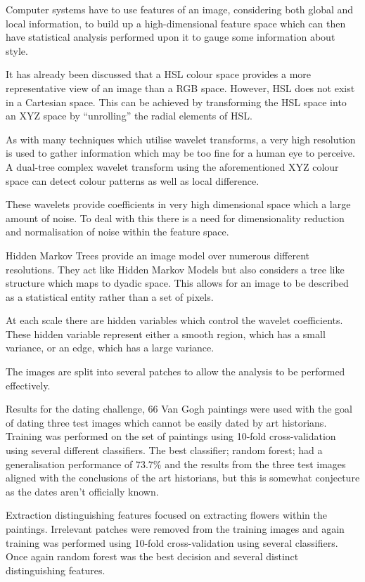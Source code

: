 \documentclass[conference]{IEEEtran}
\begin{document}
Computer systems have to use features of an image, considering both global and
local information, to build up a high-dimensional feature space which can then
have statistical analysis performed upon it to gauge some information about
style.

It has already been discussed that a \gls{HSL} colour space provides a more
representative view of an image than a \gls{RGB} space. However, \gls{HSL} does
not exist in a Cartesian space. This can be achieved by transforming the
\gls{HSL} space into an XYZ space by ``unrolling'' the radial elements of
\gls{HSL}.

As with many techniques which utilise wavelet transforms, a very high
resolution is used to gather information which may be too fine for a human eye
to perceive. A dual-tree complex wavelet transform using the aforementioned XYZ
colour space can detect colour patterns as well as local difference.

These wavelets provide coefficients in very high dimensional space which a
large amount of noise. To deal with this there is a need for dimensionality
reduction and normalisation of noise within the feature space.

Hidden Markov Trees provide an image model over numerous different resolutions.
They act like Hidden Markov Models but also considers a tree like structure
which maps to dyadic space. This allows for an image to be described as a
statistical entity rather than a set of pixels.

At each scale there are hidden variables which control the wavelet
coefficients. These hidden variable represent either a smooth region, which has
a small variance, or an edge, which has a large variance.

The images are split into several patches to allow the analysis to be performed
effectively.

Results for the dating challenge, 66 Van Gogh paintings were used with the goal
of dating three test images which cannot be easily dated by art historians.
Training was performed on the set of paintings using 10-fold cross-validation
using several different classifiers. The best classifier; random forest; had a
generalisation performance of 73.7\% and the results from the three test images
aligned with the conclusions of the art historians, but this is somewhat
conjecture as the dates aren't officially known.

Extraction distinguishing features focused on extracting flowers within the
paintings. Irrelevant patches were removed from the training images and again
training was performed using 10-fold cross-validation using several
classifiers. Once again random forest was the best decision and several
distinct distinguishing features.
\end{document}
